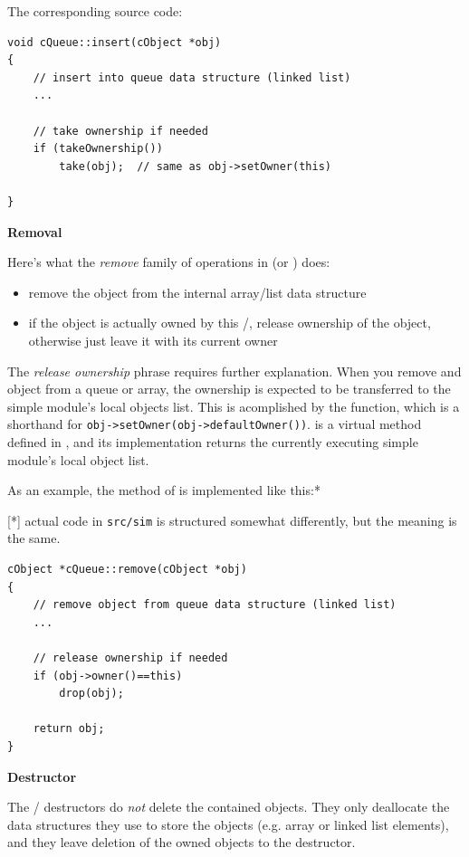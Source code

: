 The corresponding source code:

\begin{verbatim}
void cQueue::insert(cObject *obj)
{
    // insert into queue data structure (linked list)
    ...

    // take ownership if needed
    if (takeOwnership())
        take(obj);  // same as obj->setOwner(this)

}
\end{verbatim}


\textbf{Removal}

Here's what the \textit{remove} family of operations in 
(or ) does:

\begin{itemize}
    \item{remove the object from the internal array/list data structure}

    \item{if the object is actually owned by this /,
    release ownership of the object, otherwise just leave it with
    its current owner}
\end{itemize}

The \textit{release ownership} phrase requires further explanation.
When you remove and object from a queue or array, the ownership
is expected to be transferred to the simple module's local objects list.
This is acomplished by the  function, which is a shorthand for
\texttt{obj->setOwner(obj->defaultOwner())}.
 is a virtual method defined in ,
and its  implementation returns the currently executing
simple module's local object list.


As an example, the  method of  is
implemented like this:*

   [*] actual code in \texttt{src/sim} is structured somewhat differently,
   but the meaning is the same.

\begin{verbatim}
cObject *cQueue::remove(cObject *obj)
{
    // remove object from queue data structure (linked list)
    ...

    // release ownership if needed
    if (obj->owner()==this)
        drop(obj);

    return obj;
}
\end{verbatim}


\textbf{Destructor}

The / destructors do \textit{not}
delete the contained objects.
They only deallocate the data structures they use to store the objects
(e.g. array or linked list elements), and they leave deletion
of the owned objects to the  destructor.


